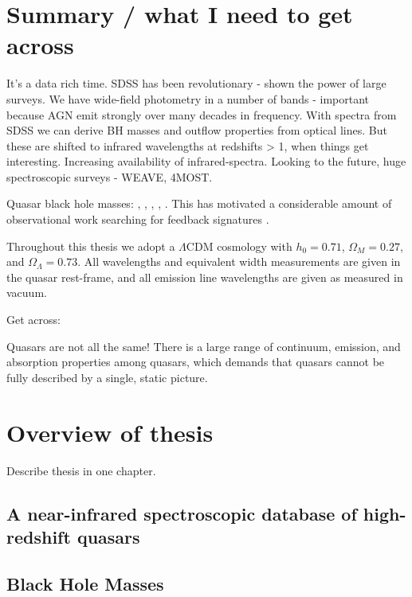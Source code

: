 \section{Summary / what I need to get across}

It's a data rich time.
SDSS has been revolutionary - shown the power of large surveys. 
We have wide-field photometry in a number of bands - important because AGN emit strongly over many decades in frequency. 
With spectra from SDSS we can derive BH masses and outflow properties from optical lines. 
But these are shifted to infrared wavelengths at redshifts > 1, when things get interesting. 
Increasing availability of infrared-spectra. 
Looking to the future, huge spectroscopic surveys - WEAVE, 4MOST. 

Quasar black hole masses: \citet{shen13}, \citet{peterson10}, \citet{peterson11}, \citet{vestergaard11}, \citet{marziani12}. 
This has motivated a considerable amount of observational work searching for feedback signatures \citep[for recent reviews, see][]{alexander12,fabian12,heckman14}. 

Throughout this thesis we adopt a $\Lambda$CDM cosmology with $h_0=0.71$, $\Omega_M=0.27$, and $\Omega_\Lambda=0.73$. 
All wavelengths and equivalent width measurements are given in the quasar rest-frame, and all emission line wavelengths are given as measured in vacuum.

Get across: 

Quasars are not all the same!
There is a large range of continuum, emission, and absorption properties among quasars, which demands that quasars cannot be fully described by a single, static picture. 







\section{Overview of thesis}

Describe thesis in one chapter. 

\subsection{A near-infrared spectroscopic database of high-redshift quasars}

\subsection{Black Hole Masses}

